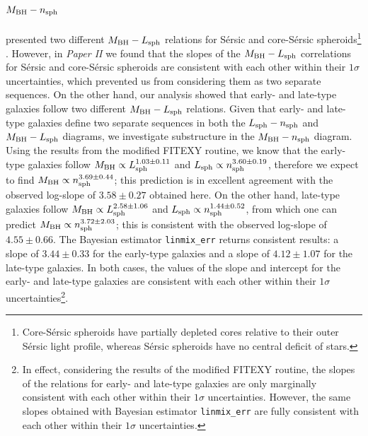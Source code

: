 \documentclass[preprint2]{emulateapj}
\begin{document}
\subsection{$M_{\rm BH} - n_{\rm sph}$}
\cite{grahamscott2013} presented two different $M_{\rm BH} - L_{\rm sph}$ relations for S\'ersic and core-S\'ersic 
spheroids\footnote{Core-S\'ersic spheroids have partially depleted cores relative to their outer S\'ersic light profile, 
whereas S\'ersic spheroids have no central deficit of stars. } \citep{graham2003coresersicmodel,trujillo2004coresersicmodel}.
However, in \emph{Paper II} we found that the slopes of the $M_{\rm BH} - L_{\rm sph}$ correlations for S\'ersic and core-S\'ersic spheroids 
are consistent with each other within their $1\sigma$ uncertainties, 
which prevented us from considering them as two separate sequences. 
On the other hand, our analysis showed that early- and late-type galaxies follow two different $M_{\rm BH} - L_{\rm sph}$ relations. 
Given that early- and late-type galaxies define two separate sequences in both the $L_{\rm sph} - n_{\rm sph}$ 
and $M_{\rm BH} - L_{\rm sph}$ diagrams, 
we investigate substructure in the $M_{\rm BH} - n_{\rm sph}$ diagram. 
Using the results from the modified FITEXY routine, 
we know that the early-type galaxies follow $M_{\rm BH} \propto L_{\rm sph}^{1.03 \pm 0.11}$ 
and $L_{\rm sph} \propto n_{\rm sph}^{3.60 \pm 0.19}$, 
therefore we expect to find $M_{\rm BH} \propto n_{\rm sph}^{3.69 \pm 0.44}$; 
this prediction is in excellent agreement with the observed log-slope of $3.58 \pm 0.27$ obtained here. 
On the other hand, late-type galaxies follow $M_{\rm BH} \propto L_{\rm sph}^{2.58 \pm 1.06}$ 
and $L_{\rm sph} \propto n_{\rm sph}^{1.44 \pm 0.52}$, 
from which one can predict $M_{\rm BH} \propto n_{\rm sph}^{3.72 \pm 2.03}$; 
this is consistent with the observed log-slope of $4.55 \pm 0.66$. 
The Bayesian estimator {\tt linmix\_err} returns consistent results: 
a slope of $3.44 \pm 0.33$ for the early-type galaxies 
and a slope of $4.12 \pm 1.07$ for the late-type galaxies. 
In both cases, the values of the slope and intercept for the early- and late-type galaxies 
are consistent with each other within their $1\sigma$ uncertainties\footnote{In effect, 
considering the results of the modified FITEXY routine, 
the slopes of the relations for early- and late-type galaxies 
are only marginally consistent with each other within their $1\sigma$ uncertainties. 
However, the same slopes obtained with Bayesian estimator {\tt linmix\_err} 
are fully consistent with each other within their $1\sigma$ uncertainties. }.
\end{document}
